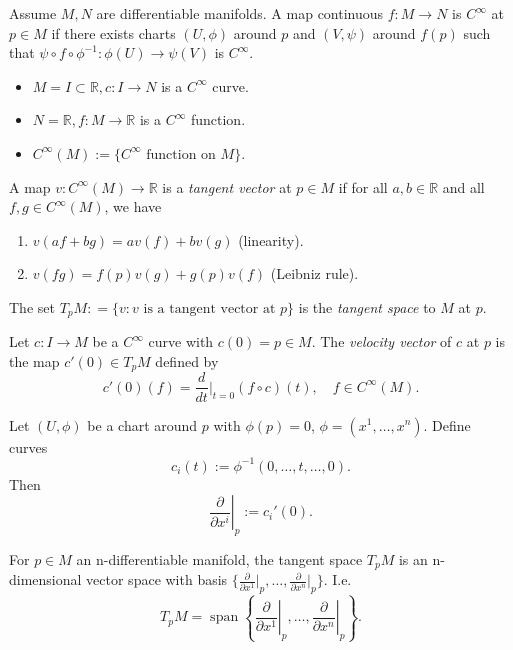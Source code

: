 \begin{definition}[$C^{\infty}$]
Assume $M,N$ are differentiable manifolds. A map continuous $f:M\to N$ is \emph{$C^{\infty}$} at $p \in M$
if there exists charts $(U, \phi)$ around $p$ and $(V, \psi)$ around $f(p)$ such that $\psi \circ f \circ \phi^{-1}: \phi(U) \to \psi(V)$ is $C^{\infty}$.
\end{definition}

\begin{remark}
\begin{itemize}
\item $M = I \subset \mathbb{R}, c:I\to N$ is a $C^{\infty}$ curve.
\item $N = \mathbb{R}, f:M\to \mathbb{R}$ is a $C^{\infty}$ function.
\item $C^{\infty}(M):= \{C^{\infty}\text{ function on } M\}$.
\end{itemize}
\end{remark}

\begin{definition}
A map $v: C^{\infty}(M) \to \mathbb{R}$ is a \emph{tangent vector} at $p \in M$ if for all $a,b\in\mathbb{R}$ and all $f,g \in C^{\infty}(M)$, we have
\begin{enumerate}
\item $v(af + bg) = av(f) + bv(g)$ (linearity).
\item $v(fg) = f(p)v(g) + g(p)v(f)$ (Leibniz rule).
\end{enumerate}
The set $T_pM : = \{v : v \text{ is a tangent vector at } p\}$ is the \emph{tangent space} to $M$ at $p$.
\end{definition}

\begin{definition}
Let $c:I \to M$ be a $C^{\infty}$ curve with $c(0) = p \in M$. The \emph{velocity vector} of $c$ at $p$ is the map $c'(0) \in T_pM$ defined by
\[c'(0)(f) = \frac{d}{dt}\bigg|_{t=0} (f \circ c)(t), \quad f \in C^{\infty}(M).\]
\end{definition}

\begin{definition}
Let $(U,\phi)$ be a chart around $p$ with $\phi(p)=0$, $\phi=(x^1,\dots,x^n)$.
Define curves
\[
c_i(t) := \phi^{-1}(0,\dots,t,\dots,0).
\]
Then
\[
\left.\frac{\partial}{\partial x^i}\right|_p := c_i'(0).
\]
\end{definition}

\begin{theorem}
For $p \in M$ an n-differentiable manifold, the tangent space $T_pM$ is an n-dimensional vector space with basis $\{\frac{\partial}{\partial x^1}\big|_p, \dots, \frac{\partial}{\partial x^n}\big|_p\}$.
I.e.
\[T_pM = \operatorname{span}\left\{\left.\frac{\partial}{\partial x^1}\right|_p, \dots, \left.\frac{\partial}{\partial x^n}\right|_p\right\}.\]
\end{theorem}

